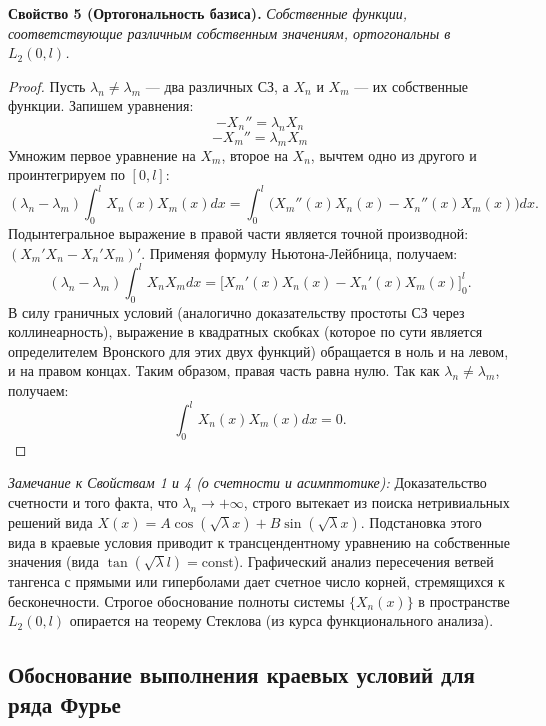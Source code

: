 \documentclass[a4paper,10pt]{article}
\begin{document}
\textbf{Свойство 5 (Ортогональность базиса).} \textit{Собственные функции, соответствующие различным собственным значениям, ортогональны в $L_2(0,l)$.}
\begin{proof}
Пусть $\lambda_n \neq \lambda_m$ — два различных СЗ, а $X_n$ и $X_m$ — их собственные функции. Запишем уравнения:
\[ -X_n'' = \lambda_n X_n \]
\[ -X_m'' = \lambda_m X_m \]
Умножим первое уравнение на $X_m$, второе на $X_n$, вычтем одно из другого и проинтегрируем по $[0,l]$:
\[ (\lambda_n - \lambda_m) \int_0^l X_n(x)X_m(x) dx = \int_0^l \big( X_m''(x)X_n(x) - X_n''(x)X_m(x) \big) dx. \]
Подынтегральное выражение в правой части является точной производной: $(X_m' X_n - X_n' X_m)'$. Применяя формулу Ньютона-Лейбница, получаем:
\[ (\lambda_n - \lambda_m) \int_0^l X_n X_m dx = \big[ X_m'(x)X_n(x) - X_n'(x)X_m(x) \big]_0^l. \]
В силу граничных условий (аналогично доказательству простоты СЗ через коллинеарность), выражение в квадратных скобках (которое по сути является определителем Вронского для этих двух функций) обращается в ноль и на левом, и на правом концах.
Таким образом, правая часть равна нулю. Так как $\lambda_n \neq \lambda_m$, получаем:
\[ \int_0^l X_n(x)X_m(x) dx = 0. \]
\end{proof}

\textit{Замечание к Свойствам 1 и 4 (о счетности и асимптотике):} Доказательство счетности и того факта, что $\lambda_n \to +\infty$, строго вытекает из поиска нетривиальных решений вида $X(x) = A\cos(\sqrt{\lambda}x) + B\sin(\sqrt{\lambda}x)$. Подстановка этого вида в краевые условия приводит к трансцендентному уравнению на собственные значения (вида $\tan(\sqrt{\lambda}l) = \text{const}$). Графический анализ пересечения ветвей тангенса с прямыми или гиперболами дает счетное число корней, стремящихся к бесконечности. Строгое обоснование полноты системы $\{X_n(x)\}$ в пространстве $L_2(0,l)$ опирается на теорему Стеклова (из курса функционального анализа).

\subsection*{Обоснование выполнения краевых условий для ряда Фурье}
\end{document}
